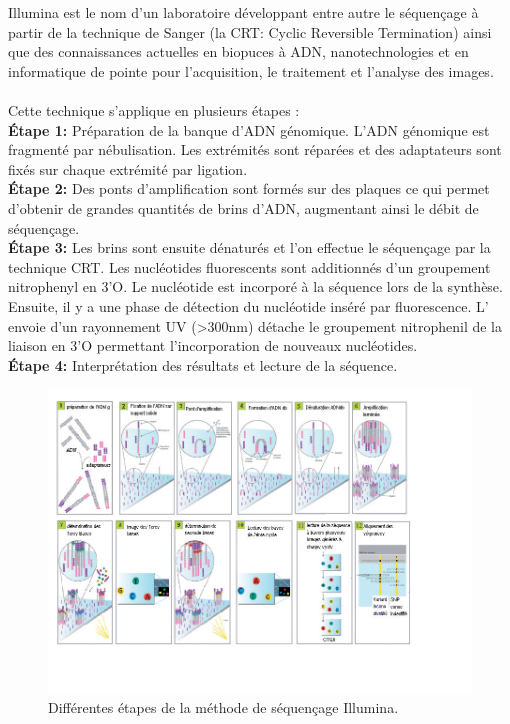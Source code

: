 Illumina est le nom d'un laboratoire développant entre autre le séquençage à partir de la technique de Sanger (la CRT: Cyclic Reversible Termination) ainsi que des connaissances actuelles en biopuces à ADN, nanotechnologies et en informatique de pointe pour l'acquisition, le traitement et l'analyse des images.
~~\\
Cette technique s'applique en plusieurs étapes :
~~\\
\textbf{Étape 1:}
Préparation de la banque d'ADN génomique.
L'ADN génomique est fragmenté par nébulisation. Les extrémités sont réparées et des adaptateurs sont fixés sur chaque extrémité par ligation.
~~\\
\textbf{Étape 2:}
Des ponts d'amplification sont formés sur des plaques ce qui permet d'obtenir de grandes quantités de brins d'ADN, augmentant ainsi le débit de séquençage.
~~\\
\textbf{Étape 3:}
Les brins sont ensuite dénaturés et l'on effectue le séquençage par la technique CRT. 
Les nucléotides fluorescents sont additionnés d'un groupement nitrophenyl en 3'O.
Le nucléotide est incorporé à la séquence lors de la synthèse.
Ensuite, il y a une phase de détection du nucléotide inséré par fluorescence.
L' envoie d'un rayonnement UV (>300nm) détache le groupement nitrophenil de la liaison en 3'O permettant l'incorporation de nouveaux nucléotides.
~~\\
\textbf{Étape 4:}
Interprétation des résultats et lecture de la séquence.
\begin{figure}[!h]
 \centering
\includegraphics[scale=0.6]{Images/sequfr1.png}
\caption{Différentes étapes de la méthode de séquençage Illumina.}
\end{figure}
~~\\